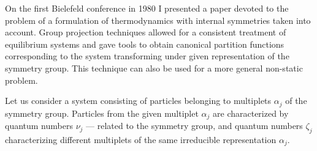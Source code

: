 \documentclass[a4paper,aps]{revtex4}
\begin{document}
On the first Bielefeld conference in 1980 I presented a paper
\cite{Redlich:1980bf} devoted to the problem of a formulation of
thermodynamics with internal symmetries taken into account. Group
projection techniques allowed for a consistent treatment of
equilibrium systems and gave tools to obtain canonical partition
functions corresponding to the system transforming under given
representation of the symmetry group. This technique can also be
used for a more general non-static problem.

Let us consider a system consisting of particles belonging to
multiplets $\alpha_j$ of the symmetry group. Particles from the
given multiplet $\alpha_j$ are characterized by quantum numbers
$\nu_j$ --- related to the symmetry group, and quantum numbers
$\zeta_j$ characterizing different multiplets of the same irreducible
representation $\alpha_j$.
\end{document}
